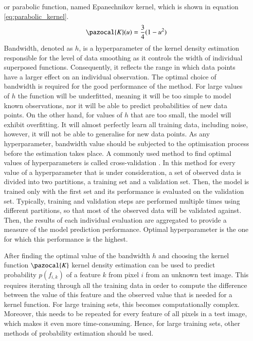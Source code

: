 or parabolic function, named Epanechnikov kernel, which is shown in equation \ref{eq:parabolic_kernel}.
\begin{equation}
    \label{eq:parabolic_kernel}
    \pazocal{K}(u) = \frac{3}{4}(1-u^2)
\end{equation}
Bandwidth, denoted as $h$, is a hyperparameter of the kernel density estimation responsible for the level of data smoothing as it controls the width of individual superposed functions. Consequently, it reflects the range in which data points have a larger effect on an individual observation. The optimal choice of bandwidth is required for the good performance of the method. For large values of $h$ the function will be underfitted, meaning it will be too simple to model known observations, nor it will be able to predict probabilities of new data points. On the other hand, for values of $h$ that are too small, the model will exhibit overfitting. It will almost perfectly learn all training data, including noise, however, it will not be able to generalise for new data points. As any hyperparameter, bandwidth value should be subjected to the optimisation process before the estimation takes place. A commonly used method to find optimal values of hyperparameters is called cross-validation \cite{cross_validation}. In this method for every value of a hyperparameter that is under consideration, a set of observed data is divided into two partitions, a training set and a validation set. Then, the model is trained only with the first set and its performance is evaluated on the validation set. Typically, training and validation steps are performed multiple times using different partitions, so that most of the observed data will be validated against. Then, the results of each individual evaluation are aggregated to provide a measure of the model prediction performance. Optimal hyperparameter is the one for which this performance is the highest.

After finding the optimal value of the bandwidth $h$ and choosing the kernel function $\pazocal{K}$ kernel density estimation can be used to predict probability $p(f_{i,k})$ of a feature $k$ from pixel $i$ from an unknown test image. This requires iterating through all the training data in order to compute the difference between the value of this feature and the observed value that is needed for a kernel function. For large training sets, this becomes computationally complex. Moreover, this needs to be repeated for every feature of all pixels in a test image, which makes it even more time-consuming. Hence, for large training sets, other methods of probability estimation should be used. 

